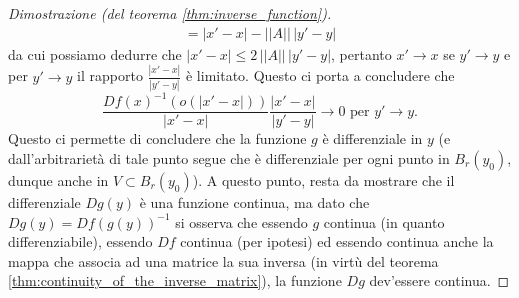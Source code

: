 \begin{proof}[Dimostrazione (del teorema \ref{thm:inverse_function})]
\begin{align*}
    &=|x'-x| - || A || \, |y'-y| &
    \end{align*}
    da cui possiamo dedurre che $|x' - x| \leq 2 \, || A || \, |y' - y|$, pertanto $x' \to x$ se $y' \to y$ e per $y' \to y$ il rapporto $\frac{|x'-x|}{|y'-y|}$ è limitato. Questo ci porta a concludere che
    $$
    \frac{Df(x)^{-1}(o(|x'-x|))}{|x'-x|} \frac{|x'-x|}{|y'-y|} \to 0 \text{ per } y' \to y.
    $$
    Questo ci permette di concludere che la funzione $g$ è differenziale in $y$ (e dall'arbitrarietà di tale punto segue che è differenziale per ogni punto in $B_r(y_0)$, dunque anche in $V \subset B_r(y_0)$). A
    questo punto, resta da mostrare che il differenziale $Dg(y)$ è una funzione continua, ma dato che $Dg(y) = Df(g(y))^{-1}$ si osserva che essendo $g$ continua (in quanto differenziabile), essendo $Df$ continua (per ipotesi)
    ed essendo continua anche la mappa che associa ad una matrice la sua inversa (in virtù del teorema \ref{thm:continuity_of_the_inverse_matrix}), la funzione $Dg$ dev'essere continua.
\end{proof}